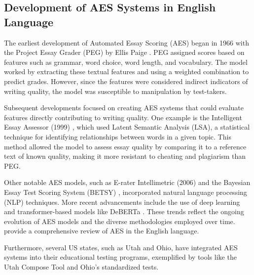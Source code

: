 \documentclass{article}
\begin{document}
	\subsection{Development of AES Systems in English Language}
	The earliest development of Automated Essay Scoring (AES) began in 1966 with the Project Essay Grader (PEG) by Ellis Paige \cite{page2003peg}. PEG assigned scores based on features such as grammar, word choice, word length, and vocabulary. The model worked by extracting these textual features and using a weighted combination to predict grades. However, since the features were considered indirect indicators of writing quality, the model was susceptible to manipulation by test-takers.
	
	Subsequent developments focused on creating AES systems that could evaluate features directly contributing to writing quality. One example is the Intelligent Essay Assessor (1999) \cite{foltz1999essayassessor}, which used Latent Semantic Analysis (LSA), a statistical technique for identifying relationships between words in a given topic. This method allowed the model to assess essay quality by comparing it to a reference text of known quality, making it more resistant to cheating and plagiarism than PEG.
	
	Other notable AES models, such as E-rater Intellimetric (2006) \cite{rudner2006intellimetric} and the Bayesian Essay Test Scoring System (BETSY) \cite{rudner2002bayes}, incorporated natural language processing (NLP) techniques. More recent advancements include the use of deep learning and transformer-based models like DeBERTa \cite{susanto2023deberta}. These trends reflect the ongoing evolution of AES models and the diverse methodologies employed over time. \textcite{ramesh2022review} provide a comprehensive review of AES in the English language.
	
	Furthermore, several US states, such as Utah and Ohio, have integrated AES systems into their educational testing programs, exemplified by tools like the Utah Compose Tool and Ohio's standardized tests.
	
\end{document}
